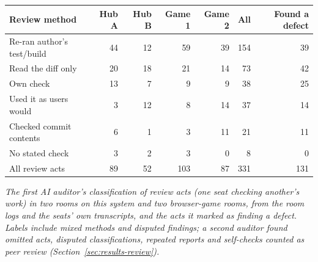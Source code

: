 \begin{tabular}{lrrrrrr}
\toprule
Review method & Hub A & Hub B & Game 1 & Game 2 & All & Found a defect \\
\midrule
Re-ran author's test/build & 44 & 12 & 59 & 39 & 154 & 39 \\
Read the diff only & 20 & 18 & 21 & 14 & 73 & 42 \\
Own check & 13 & 7 & 9 & 9 & 38 & 25 \\
Used it as users would & 3 & 12 & 8 & 14 & 37 & 14 \\
Checked commit contents & 6 & 1 & 3 & 11 & 21 & 11 \\
No stated check & 3 & 2 & 3 & 0 & 8 & 0 \\
\midrule
All review acts & 89 & 52 & 103 & 87 & 331 & 131 \\
\bottomrule
\end{tabular}

\emph{The first AI auditor's classification of review acts (one seat checking another's work) in two rooms on this system and two browser-game rooms, from the room logs and the seats' own transcripts, and the acts it marked as finding a defect. Labels include mixed methods and disputed findings; a second auditor found omitted acts, disputed classifications, repeated reports and self-checks counted as peer review (Section~\ref{sec:results-review}).}
